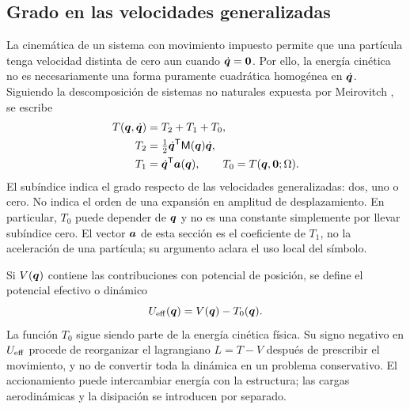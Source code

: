 \subsection{Grado en las velocidades generalizadas}
La cinemática de un sistema con movimiento impuesto permite que una partícula tenga velocidad distinta de cero aun cuando $\dot{\bm{q}}=\bm{0}$. Por ello, la energía cinética no es necesariamente una forma puramente cuadrática homogénea en $\dot{\bm{q}}$. Siguiendo la descomposición de sistemas no naturales expuesta por Meirovitch \cite[sección 4.1]{meirovitch}, se escribe
\begin{align}
 T(\bm{q},\dot{\bm{q}})&=T_2+T_1+T_0,\\
 T_2&=\tfrac12\dot{\bm{q}}^{\mathsf T}\mathsf M(\bm{q})\dot{\bm{q}},\\
 T_1&=\dot{\bm{q}}^{\mathsf T}\bm{a}(\bm{q}),\qquad
 T_0=T(\bm{q},\bm{0};\Omega).
 \label{eq:Tdecomp}
\end{align}
El subíndice indica el grado respecto de las velocidades generalizadas: dos, uno o cero. No indica el orden de una expansión en amplitud de desplazamiento. En particular, $T_0$ puede depender de $\bm{q}$ y no es una constante simplemente por llevar subíndice cero. El vector $\bm{a}$ de esta sección es el coeficiente de $T_1$, no la aceleración de una partícula; su argumento aclara el uso local del símbolo.

Si $V(\bm{q})$ contiene las contribuciones con potencial de posición, se define el potencial efectivo o dinámico
\begin{equation}
 U_{\rm eff}(\bm{q})=V(\bm{q})-T_0(\bm{q}).
 \label{eq:Ueff}
\end{equation}
La función $T_0$ sigue siendo parte de la energía cinética física. Su signo negativo en $U_{\rm eff}$ procede de reorganizar el lagrangiano $L=T-V$ después de prescribir el movimiento, y no de convertir toda la dinámica en un problema conservativo. El accionamiento puede intercambiar energía con la estructura; las cargas aerodinámicas y la disipación se introducen por separado.

